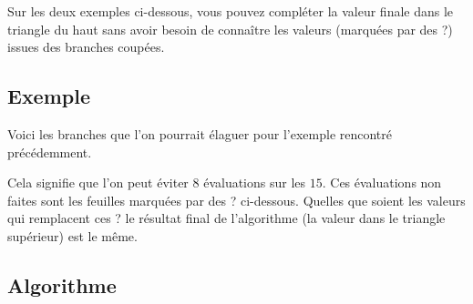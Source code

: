 \documentclass[11pt,class=report,crop=false]{standalone}
\begin{document}
\begin{center}
\begin{minipage}{0.45\textwidth}
\footnotesize	
{}
\end{minipage}\qquad\qquad
\begin{minipage}{0.45\textwidth}
\footnotesize	
{}
\end{minipage}
\end{center}

\begin{exemple}
Sur les deux exemples ci-dessous, vous pouvez compléter la valeur finale dans le triangle du haut sans avoir besoin de connaître les valeurs (marquées par des \og{}?\fg{}) issues des branches coupées.
\begin{center}
	\begin{minipage}{0.45\textwidth}
		\footnotesize	
	\end{minipage}\qquad\qquad
	\begin{minipage}{0.45\textwidth}
		\footnotesize	
	\end{minipage}
\end{center}
\end{exemple}
	

\subsection{Exemple}

Voici les branches que l'on pourrait élaguer pour l'exemple rencontré précédemment.


Cela signifie que l'on peut éviter $8$ évaluations sur les $15$.
Ces évaluations non faites sont les feuilles marquées par des \og{}?\fg{} ci-dessous. Quelles que soient les valeurs qui remplacent ces \og{}?\fg{} le résultat final de l'algorithme (la valeur dans le triangle supérieur) est le même.
 


	
\subsection{Algorithme}
\end{document}
